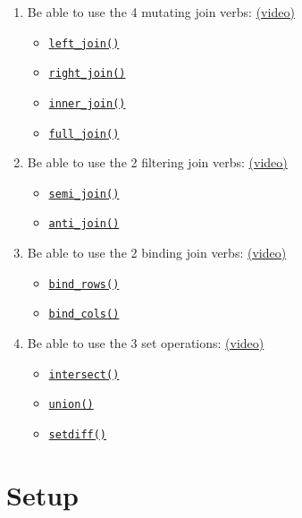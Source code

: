 \documentclass[
  oneside]{book}
\providecommand{\tightlist}{%
  \setlength{\itemsep}{0pt}\setlength{\parskip}{0pt}}
\begin{document}
\begin{enumerate}
\def\labelenumi{\arabic{enumi}.}
\tightlist
\item
  Be able to use the 4 mutating join verbs: \href{https://youtu.be/WV0yg6f3DNM}{(video)}

  \begin{itemize}
  \tightlist
  \item
    \protect\hyperlink{left_join}{\texttt{left\_join()}}
  \item
    \protect\hyperlink{right_join}{\texttt{right\_join()}}
  \item
    \protect\hyperlink{inner_join}{\texttt{inner\_join()}}
  \item
    \protect\hyperlink{full_join}{\texttt{full\_join()}}
  \end{itemize}
\item
  Be able to use the 2 filtering join verbs: \href{https://youtu.be/ijoCEKifefQ}{(video)}

  \begin{itemize}
  \tightlist
  \item
    \protect\hyperlink{semi_join}{\texttt{semi\_join()}}
  \item
    \protect\hyperlink{anti_join}{\texttt{anti\_join()}}
  \end{itemize}
\item
  Be able to use the 2 binding join verbs: \href{https://youtu.be/8RWdNhbVZ4I}{(video)}

  \begin{itemize}
  \tightlist
  \item
    \protect\hyperlink{bind_rows}{\texttt{bind\_rows()}}
  \item
    \protect\hyperlink{bind_cols}{\texttt{bind\_cols()}}
  \end{itemize}
\item
  Be able to use the 3 set operations: \href{https://youtu.be/c3V33ElWUYI}{(video)}

  \begin{itemize}
  \tightlist
  \item
    \protect\hyperlink{intersect}{\texttt{intersect()}}
  \item
    \protect\hyperlink{union}{\texttt{union()}}
  \item
    \protect\hyperlink{setdiff}{\texttt{setdiff()}}
  \end{itemize}
\end{enumerate}

\hypertarget{setup-joins}{%
\section{Setup}\label{setup-joins}}
\end{document}
